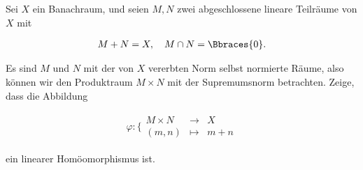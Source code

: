 \begin{exercise}

Sei $X$ ein Banachraum, und seien $M,N$ zwei abgeschlossene lineare Teilräume von $X$ mit

\begin{align*}
  M + N = X, \quad M \cap N = \Bbraces{0}.
\end{align*}

Es sind $M$ und $N$ mit der von $X$ vererbten Norm selbst normierte Räume, also können wir den Produktraum $M \times N$ mit der Supremumsnorm betrachten.
Zeige, dass die Abbildung

\begin{align*}
  \varphi:
  \bigg \{
  \begin{matrix}
    M \times N & \rightarrow & X \\
    (m, n)     & \mapsto     & m + n
  \end{matrix}
\end{align*}

ein linearer Homöomorphismus ist.

\end{exercise}

